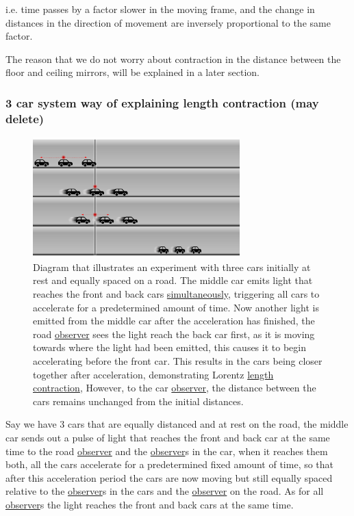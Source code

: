 i.e. time passes by a factor slower in the moving frame, and the change in distances in the direction of movement are inversely proportional to the same factor.

The reason that we do not worry about contraction in the distance between the floor and ceiling mirrors, will be explained in a later section.




\subsubsection{3 car system way of explaining length contraction (may delete)}


\begin{figure}[ht]
	\centering
	\includegraphics[width=8cm]{images/pdf/cars.pdf}
	\caption{Diagram that illustrates an experiment with three cars initially at rest and equally spaced on a road. The middle car emits light that reaches the front and back cars \protect\hyperlink{def-simultaneity}{simultaneously}, triggering all cars to accelerate for a predetermined amount of time. Now another light is emitted from the middle car after the acceleration has finished, the road \protect\hyperlink{def-observer}{observer} sees the light reach the back car first, as it is moving towards where the light had been emitted, this causes it to begin accelerating before the front car. This results in the cars being closer together after acceleration, demonstrating Lorentz \protect\hyperlink{def-length-contraction}{length contraction}, However, to the car \protect\hyperlink{def-observer}{observer}, the distance between the cars remains unchanged from the initial distances.}
	\label{fig: cars}
\end{figure}

Say we have 3 cars that are equally distanced and at rest on the road, the middle car sends out a pulse of light that reaches the front and back car at the same time to the road \hyperlink{def-observer}{observer} and the \hyperlink{def-observer}{observer}s in the car, when it reaches them both, all the cars accelerate for a predetermined fixed amount of time, so that after this acceleration period the cars are now moving but still equally spaced relative to the \hyperlink{def-observer}{observer}s in the cars and the \hyperlink{def-observer}{observer} on the road. As for all \hyperlink{def-observer}{observer}s the light reaches the front and back cars at the same time.

